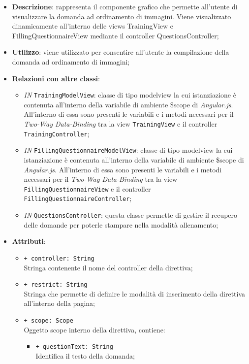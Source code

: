 		\begin{itemize}
			\item \textbf{Descrizione}: rappresenta il componente grafico che permette all'utente di visualizzare la domanda ad ordinamento di immagini. Viene visualizzato dinamicamente all'interno delle views TrainingView e FillingQuestionnaireView mediante il controller QuestionsController;
			\item \textbf{Utilizzo}: viene utilizzato per consentire all'utente la compilazione della domanda ad ordinamento di immagini;
			\item \textbf{Relazioni con altre classi}: 
			\begin{itemize}
				\item \textit{IN} \texttt{TrainingModelView}: classe di tipo modelview la cui istanziazione è contenuta all'interno della variabile di ambiente \$scope di \textit{Angular.js}. All'interno di essa sono presenti le variabili e i metodi necessari per il \textit{Two-Way Data-Binding} tra la view \texttt{TrainingView} e il controller \texttt{TrainingController}; 
				\item \textit{IN} \texttt{FillingQuestionnaireModelView}: classe di tipo modelview la cui istanziazione è contenuta all'interno della variabile di ambiente \$scope di \textit{Angular.js}. All'interno di essa sono presenti le variabili e i metodi necessari per il \textit{Two-Way Data-Binding} tra la view \texttt{FillingQuestionnaireView} e il controller \texttt{FillingQuestionnaireController};
				\item \textit{IN} \texttt{QuestionsController}: questa classe permette di gestire il recupero delle domande per poterle stampare nella modalità allenamento;
			\end{itemize}
			\item \textbf{Attributi}: 
			\begin{itemize}
				\item \texttt{+ controller: String} \\ Stringa contenente il nome del controller della direttiva;
				\item \texttt{+ restrict: String} \\ Stringa che permette di definire le modalità di inserimento della direttiva all'interno della pagina;
				\item \texttt{+ scope: Scope} \\ Oggetto scope interno della direttiva, contiene:
				\begin{itemize}
					\item \texttt{+ questionText: String} \\ Identifica il testo della domanda;

\end{itemize}
\end{itemize}
\end{itemize}
